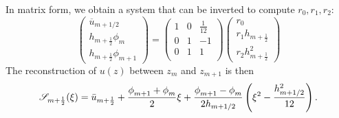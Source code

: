 In matrix form, we obtain a system that can be inverted to
compute $r_0, r_1, r_2$:
\begin{equation}
    \begin{pmatrix}
    \overline{u}_{m+1/2} \\
    h_{m+\frac{1}{2}} \phi_m \\
	    h_{m+\frac{1}{2}} \phi_{m+1}
    \end{pmatrix} = 
    \begin{pmatrix}
    1 & 0 & \frac{1}{12} \\
    0 & 1 & -1 \\
    0 & 1 & 1 \\
    \end{pmatrix}
    \begin{pmatrix}
    r_0 \\
    r_1 h_{m+\frac{1}{2}} \\
    r_2 h_{m+\frac{1}{2}}^2
    \end{pmatrix}
\end{equation}
The reconstruction of $u(z)$ between $z_m$ and $z_{m+1}$
is then
\begin{equation}
\label{eq:ND_NeutralCase_quadraticReconstruction}
{\cal S}_{m+\frac{1}{2}}(\xi) =
	\Bar{u}_{m+\frac{1}{2}} + 
	\frac{\phi_{m+1}^{} + \phi_{m}^{}}{2} \xi
	+ \frac{\phi_{m+1}^{} - \phi_{m}^{}}{2h_{m+1/2}}
	\left(\xi^2 - \frac{h_{m+1/2}^2}{12}\right).
\end{equation}


